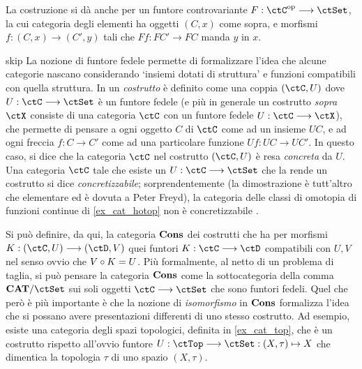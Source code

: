 La costruzione si dà anche per un funtore controvariante \(F : \ctC^\op\fun\ctSet\), la cui categoria degli elementi ha oggetti \((C,x)\) come sopra, e morfismi \(f : (C,x)\to (C',y)\) tali che \(Ff : FC'\to FC\) manda \(y\) in \(x\).
\begin{hDigression}{skip}\label{def_costrutto}
	La nozione di funtore fedele permette di formalizzare l'idea che alcune categorie nascano considerando `insiemi dotati di struttura' e funzioni compatibili con quella struttura. In \cite[I.5.1]{acc} un \emph{costrutto} è definito come una coppia \((\ctC,U)\) dove \(U : \ctC \fun\ctSet\) è un funtore fedele (e più in generale un costrutto \emph{sopra \(\ctX\)} consiste di una categoria \(\ctC\) con un funtore fedele \(U : \ctC\fun\ctX\)), che permette di pensare a ogni oggetto \(C\) di \(\ctC\) come ad un insieme \(UC\), e ad ogni freccia \(f : C\to C'\) come ad una particolare funzione \(Uf : UC\to UC'\). In questo caso, si dice che la categoria \(\ctC\) nel costrutto \((\ctC,U)\) è resa \emph{concreta} da \(U\). Una categoria \(\ctC\) tale che esiste un \(U : \ctC \fun\ctSet\) che la rende un costrutto si dice \emph{concretizzabile}; sorprendentemente (la dimostrazione è tutt'altro che elementare ed è dovuta a Peter Freyd), la categoria delle classi di omotopia di funzioni continue di \ref{ex_cat_hotop} non è concretizzabile \cite{Freydconc}.

	Si può definire, da qui, la categoria \(\mathbf{Cons}\) dei costrutti che ha per morfismi \(K : (\ctC,U)\fun (\ctD,V)\) quei funtori \(K : \ctC\fun\ctD\) compatibili con \(U,V\) nel senso ovvio che \(V\circ K=U\). Più formalmente, al netto di un problema di taglia, si può pensare la categoria \(\mathbf{Cons}\) come la sottocategoria della comma \(\cate{CAT}/\ctSet\) sui soli oggetti \(\ctC\fun\ctSet\) che sono funtori fedeli. Quel che però è più importante è che la nozione di \emph{isomorfismo} in \(\mathbf{Cons}\) formalizza l'idea che si possano avere presentazioni differenti di uno stesso costrutto. Ad esempio, esiste una categoria degli spazi topologici, definita in \ref{ex_cat_top}, che è un costrutto rispetto all'ovvio funtore \(U : \ctTop\fun\ctSet : (X,\tau)\mapsto X\) che dimentica la topologia \(\tau\) di uno spazio \((X,\tau)\).


\end{hDigression}
